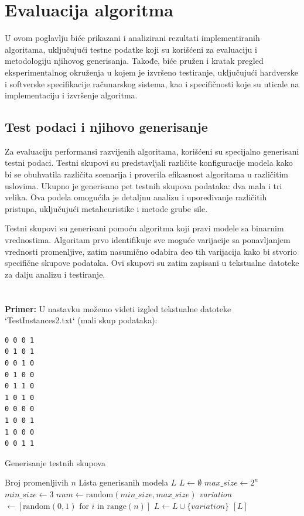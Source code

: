 \documentclass[12pt,oneside]{memoir}
\begin{document}
\chapter{Evaluacija algoritma}
U ovom poglavlju biće prikazani i analizirani rezultati implementiranih algoritama, uključujući testne podatke koji su korišćeni za evaluaciju i metodologiju njihovog generisanja. Takođe, biće pružen i kratak pregled eksperimentalnog okruženja u kojem je izvršeno testiranje, uključujući hardverske i softverske specifikacije računarskog sistema, kao i specifičnosti koje su uticale na implementaciju i izvršenje algoritma.
\label{chap:algoritmi}

\section{Test podaci i njihovo generisanje}

Za evaluaciju performansi razvijenih algoritama, korišćeni su specijalno generisani testni podaci. Testni skupovi su predstavljali različite konfiguracije modela kako bi se obuhvatila različita scenarija i proverila efikasnost algoritama u različitim uslovima. Ukupno je generisano pet testnih skupova podataka: dva mala i tri velika. Ova podela omogućila je detaljnu analizu i upoređivanje različitih pristupa, uključujući metaheuristike i metode grube sile.

Testni skupovi su generisani pomoću algoritma koji pravi modele sa binarnim vrednostima. Algoritam prvo identifikuje sve moguće varijacije sa ponavljanjem vrednosti promenljive, zatim nasumično odabira deo tih varijacija kako bi stvorio specifične skupove podataka. Ovi skupovi su zatim zapisani u tekstualne datoteke za dalju analizu i testiranje.\\\\\\

\textbf{Primer:} U nastavku možemo videti izgled tekstualne datoteke `TestInstances2.txt` (mali skup podataka):

\begin{lstlisting}[basicstyle=\ttfamily, frame=single]
0 0 0 1
0 1 0 1
0 0 1 0
0 1 0 0
0 1 1 0
1 0 1 0
0 0 0 0
1 0 0 1
1 0 0 0
0 0 1 1
\end{lstlisting}

\begin{algorithm}[H]
\caption{Generisanje testnih skupova}
\renewcommand{\algorithmicrequire}{\textbf{Ulaz:}}
\renewcommand{\algorithmicensure}{\textbf{Izlaz:}}
\begin{algorithmic}[1]
\REQUIRE Broj promenljivih $n$
\ENSURE Lista generisanih modela $L$ 
\STATE $L \gets \emptyset$
\STATE $max\_size \gets 2^n$
\STATE $min\_size \gets 3$
\STATE $num \gets \text{random}(min\_size, 
 max\_size)$
    \STATE \textit{variation} $\gets [\text{random}(0, 1) \text{ for } i \text{ in } \text{range}(n)]$
    \STATE $L \gets L \cup \{variation\}$
\ENDWHILE
\RETURN $[L]$
\end{algorithmic}
\end{algorithm}
\end{document}
